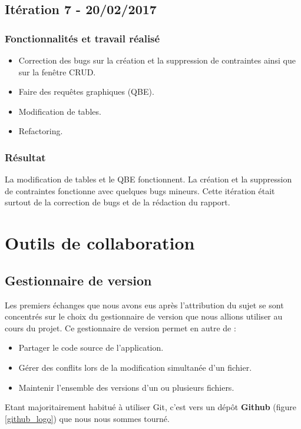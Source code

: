 \subsection{Itération 7 - 20/02/2017}
\subsubsection{Fonctionnalités et travail réalisé}
\begin{itemize}
\item Correction des bugs sur la création et la suppression de contraintes ainsi que sur la fenêtre CRUD.
\item Faire des requêtes graphiques (QBE).
\item Modification de tables.
\item Refactoring.
\end{itemize}

\subsubsection{Résultat}

La modification de tables et le QBE fonctionnent.
La création et la suppression de contraintes fonctionne avec quelques bugs mineurs.
Cette itération était surtout de la correction de bugs et de la rédaction du rapport. 


\section{Outils de collaboration}

\subsection{Gestionnaire de version}
Les premiers échanges que nous avons eus après l'attribution du sujet se sont concentrés sur le choix du gestionnaire de version que nous allions utiliser au cours du projet. Ce gestionnaire de version permet en autre de :
\begin{itemize}
\item Partager le code source de l'application.
\item Gérer des conflits lors de la modification simultanée d'un fichier.
\item Maintenir l'ensemble des versions d'un ou plusieurs fichiers.\\
\end{itemize}

Etant majoritairement habitué à utiliser Git, c'est vers un dép\^ot \textbf{Github} (figure \ref{github_logo}) que nous nous sommes tourné.

